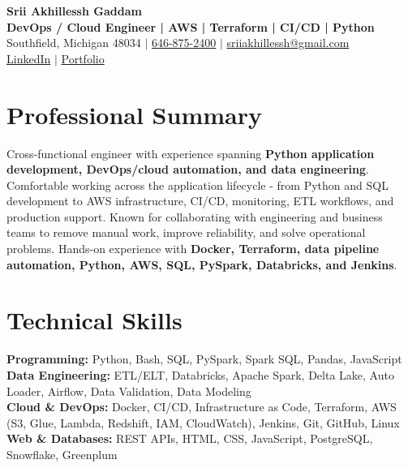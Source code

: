 \documentclass[letterpaper,10pt]{article}
\begin{document}
\fontsize{9.35pt}{10.45pt}\selectfont

\begin{center}
    {\LARGE \textbf{Srii Akhillessh Gaddam}} \\[-1pt]
    \textbf{DevOps / Cloud Engineer | AWS | Terraform | CI/CD | Python} \\[2pt]
    Southfield, Michigan 48034 $|$
    \href{tel:6468752400}{646-875-2400} $|$
    \href{mailto:sriiakhillessh@gmail.com}{sriiakhillessh@gmail.com} \\[1pt]
    \href{https://www.linkedin.com/in/srii-akhiilessh-gaddam-b48668191/}{LinkedIn} $|$
    \href{https://sriiakhillesshg.github.io/portfolio/}{Portfolio}
\end{center}
\vspace{-8pt}

\section{Professional Summary}
\small{Cross-functional engineer with experience spanning \textbf{Python application development, DevOps/cloud automation, and data engineering}. Comfortable working across the application lifecycle - from Python and SQL development to AWS infrastructure, CI/CD, monitoring, ETL workflows, and production support. Known for collaborating with engineering and business teams to remove manual work, improve reliability, and solve operational problems. Hands-on experience with \textbf{Docker, Terraform, data pipeline automation, Python, AWS, SQL, PySpark, Databricks, and Jenkins}.}

\section{Technical Skills}
\small{
\textbf{Programming:} Python, Bash, SQL, PySpark, Spark SQL, Pandas, JavaScript \\
\textbf{Data Engineering:} ETL/ELT, Databricks, Apache Spark, Delta Lake, Auto Loader, Airflow, Data Validation, Data Modeling \\
\textbf{Cloud \& DevOps:} Docker, CI/CD, Infrastructure as Code, Terraform, AWS (S3, Glue, Lambda, Redshift, IAM, CloudWatch), Jenkins, Git, GitHub, Linux \\
\textbf{Web \& Databases:} REST APIs, HTML, CSS, JavaScript, PostgreSQL, Snowflake, Greenplum
}
\end{document}
